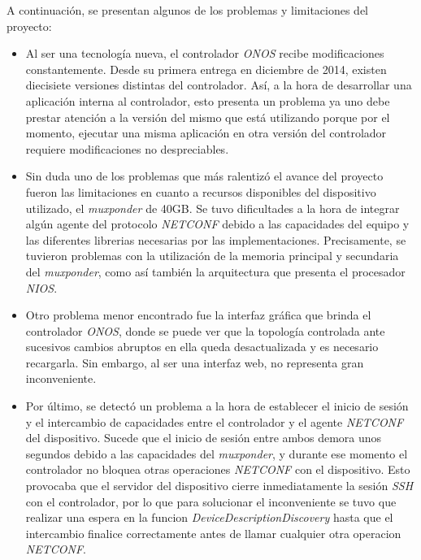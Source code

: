 A continuación, se presentan algunos de los problemas y limitaciones del proyecto:

\begin{itemize}
    
    \item Al ser una tecnología nueva, el controlador \textit{ONOS} recibe modificaciones constantemente. Desde su primera entrega en diciembre de 2014, existen diecisiete versiones distintas del controlador. Así, a la hora de desarrollar una aplicación interna al controlador, esto presenta un problema ya uno debe prestar atención a la versión del mismo que está utilizando porque por el momento, ejecutar una misma aplicación en otra versión del controlador requiere modificaciones no despreciables.     
    
    \item Sin duda uno de los problemas que más ralentizó el avance del proyecto fueron las limitaciones en cuanto a recursos disponibles del dispositivo utilizado, el \textit{muxponder} de 40GB. Se tuvo dificultades a la hora de integrar algún agente del protocolo \textit{NETCONF} debido a las capacidades del equipo y las diferentes librerias necesarias por las implementaciones. Precisamente, se tuvieron problemas con la utilización de la memoria principal y secundaria del \textit{muxponder}, como así también la arquitectura que presenta el procesador \textit{NIOS}.

    \item Otro problema menor encontrado fue la interfaz gráfica que brinda el controlador \textit{ONOS}, donde se puede ver que la topología controlada ante sucesivos cambios abruptos en ella queda desactualizada y es necesario recargarla. Sin embargo, al ser una interfaz web, no representa gran inconveniente.
    
    \item Por último, se detectó un problema a la hora de establecer el inicio de sesión y el intercambio de capacidades entre el controlador y el agente \textit{NETCONF} del dispositivo. Sucede que el inicio de sesión entre ambos demora unos segundos debido a las capacidades del \textit{muxponder}, y durante ese momento el controlador no bloquea otras operaciones \textit{NETCONF} con el dispositivo. Esto provocaba que el servidor del dispositivo cierre inmediatamente la sesión \textit{SSH} con el controlador, por lo que para solucionar el inconveniente se tuvo que realizar una espera en la funcion \textit{DeviceDescriptionDiscovery} hasta que el intercambio finalice correctamente antes de llamar cualquier otra operacion \textit{NETCONF}.
    
\end{itemize}

